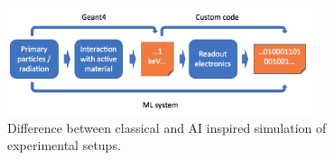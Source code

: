 \begin{figure}[h]
    \centering

    \includegraphics[width=0.8\textwidth]{images/electronics.png}
    \caption{Difference between classical and AI inspired simulation of experimental setups.}
     \label{fig:elec}

\end{figure}



